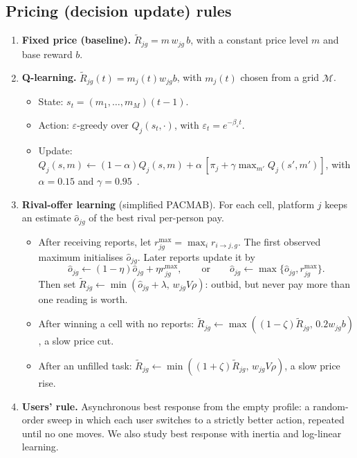 \documentclass[12pt,draftcls,onecolumn]{IEEEtran}
\begin{document}
\subsection{Pricing (decision update) rules}\label{sec:rules}
\begin{enumerate}
\item \textbf{Fixed price (baseline).} $\tilde R_{jg}=m\,w_{jg}\,b$, with a constant price level $m$ and base reward $b$.
\item \textbf{Q-learning.} $\tilde R_{jg}(t)=m_j(t)w_{jg}b$, with $m_j(t)$ chosen from a grid $\mathcal M$.
  \begin{itemize}
  \item State: $s_t=(m_1,\dots,m_M)(t-1)$.
  \item Action: $\varepsilon$-greedy over $Q_j(s_t,\cdot)$, with $\varepsilon_t=e^{-\beta_\varepsilon t}$.
  \item Update: $Q_j(s,m)\leftarrow(1-\alpha)Q_j(s,m)+\alpha\,[\pi_j+\gamma\max_{m'}Q_j(s',m')]$, with $\alpha=0.15$ and $\gamma=0.95$~\cite{calvano2020ai}.
  \end{itemize}
\item \textbf{Rival-offer learning} (simplified PACMAB). For each cell, platform $j$ keeps an estimate $\hat o_{jg}$ of the best rival per-person pay.
  \begin{itemize}
  \item After receiving reports, let $r_{jg}^{\max}=\max_i r_{i\to j,g}$. The first observed maximum initialises $\hat o_{jg}$. Later reports update it by
  \[\hat o_{jg}\leftarrow(1-\eta)\hat o_{jg}+\eta r_{jg}^{\max},\qquad
    \text{or}\qquad \hat o_{jg}\leftarrow\max\{\hat o_{jg},r_{jg}^{\max}\}.\]
  Then set $\tilde R_{jg}\leftarrow\min(\hat o_{jg}+\lambda,\,w_{jg}V\rho)$: outbid, but never pay more than one reading is worth.
  \item After winning a cell with no reports: $\tilde R_{jg}\leftarrow\max((1-\zeta)\tilde R_{jg},\,0.2w_{jg}b)$, a slow price cut.
  \item After an unfilled task: $\tilde R_{jg}\leftarrow\min((1+\zeta)\tilde R_{jg},\,w_{jg}V\rho)$, a slow price rise.
  \end{itemize}
\item \textbf{Users' rule.} Asynchronous best response from the empty profile: a random-order sweep in which each user switches to a strictly better action, repeated until no one moves. We also study best response with inertia and log-linear learning.
\end{enumerate}
\end{document}
